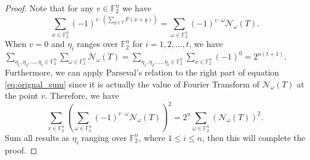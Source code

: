 \documentclass[12 pt]{article}
\def\F{{\mathbb F}}
\begin{document}
  \begin{proof}
    Note that for any $ v\in\F_2^n $ we have 
    \begin{equation}\label{eq:orignal_sum}
      \sum_{x\in\F_2^n}(-1)^{v\cdot\left(\sum_{y\in T}F(x+y)\right)}=\sum_{\omega\in\F_2^n}(-1)^{v\cdot\omega}\mathcal{N}_{\omega}(T).
    \end{equation}
    When $ v=0 $ and $ \eta_i $ ranges over $ \F_2^n $ for $ i=1,2,...,t $, 
    we have $ \sum_{\eta_1,\eta_2,\dots,\eta_t\in\F_2^n}\sum_{\omega\in\F_2^n}\mathcal{N}_{\omega}(T)=\sum_{\eta_1,\eta_2,\dots,\eta_t\in\F_2^n}\sum_{x\in\F_2^n}(-1)^0=2^{n(t+1)} $.  
    Furthermore, we can apply Parseval's relation to the right part of equation \eqref{eq:orignal_sum} 
    since it is actually the value of Fourier Transform of $ \mathcal{N}_{\omega}(T) $ at the point $ v $. 
    Therefore, we have 
    \[\sum_{v\in\F_2^n}\left( \sum_{\omega\in\F_2^n}(-1)^{v\cdot\omega}\mathcal{N}_{\omega}(T)\right)^2 = 2^n\sum_{\omega\in\F_2^n}\left( \mathcal{N}_{\omega}(T) \right)^2.\]
    Sum all results as $ \eta_i $ ranging over $ \F_2^n $, where $ 1\le i\le n $, then this will complete the proof. 
  \end{proof}
\end{document}
